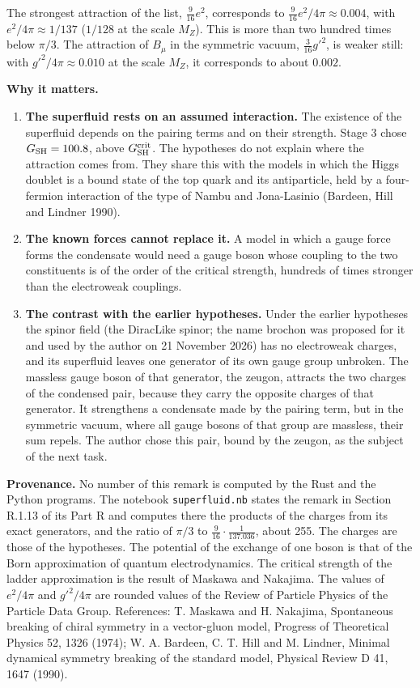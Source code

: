 \documentclass[
  10pt,
]{article}
\providecommand{\tightlist}{%
  \setlength{\itemsep}{0pt}\setlength{\parskip}{0pt}}
\begin{document}
The strongest attraction of the list, \(\tfrac9{16}e^2\), corresponds to
\(\tfrac9{16}e^2/4\pi\approx0.004\), with \(e^2/4\pi\approx1/137\)
(\(1/128\) at the scale \(M_Z\)). This is more than two hundred times
below \(\pi/3\). The attraction of \(B_\mu\) in the symmetric vacuum,
\(\tfrac3{16}g'^2\), is weaker still: with \(g'^2/4\pi\approx0.010\) at
the scale \(M_Z\), it corresponds to about \(0.002\).

\textbf{Why it matters.}

\begin{enumerate}
\def\labelenumi{\arabic{enumi}.}
\tightlist
\item
  \textbf{The superfluid rests on an assumed interaction.} The existence
  of the superfluid depends on the pairing terms and on their strength.
  Stage 3 chose \(G_{\rm SH}=100.8\), above \(G^{\rm crit}_{\rm SH}\).
  The hypotheses do not explain where the attraction comes from. They
  share this with the models in which the Higgs doublet is a bound state
  of the top quark and its antiparticle, held by a four-fermion
  interaction of the type of Nambu and Jona-Lasinio (Bardeen, Hill and
  Lindner 1990).
\item
  \textbf{The known forces cannot replace it.} A model in which a gauge
  force forms the condensate would need a gauge boson whose coupling to
  the two constituents is of the order of the critical strength,
  hundreds of times stronger than the electroweak couplings.
\item
  \textbf{The contrast with the earlier hypotheses.} Under the earlier
  hypotheses the spinor field (the DiracLike spinor; the name brochon
  was proposed for it and used by the author on 21 November 2026) has no
  electroweak charges, and its superfluid leaves one generator of its
  own gauge group unbroken. The massless gauge boson of that generator,
  the zeugon, attracts the two charges of the condensed pair, because
  they carry the opposite charges of that generator. It strengthens a
  condensate made by the pairing term, but in the symmetric vacuum,
  where all gauge bosons of that group are massless, their sum repels.
  The author chose this pair, bound by the zeugon, as the subject of the
  next task.
\end{enumerate}

\textbf{Provenance.} No number of this remark is computed by the Rust
and the Python programs. The notebook \texttt{superfluid.nb} states the
remark in Section R.1.13 of its Part R and computes there the products
of the charges from its exact generators, and the ratio of \(\pi/3\) to
\(\tfrac9{16}\cdot\tfrac1{137.036}\), about 255. The charges are those
of the hypotheses. The potential of the exchange of one boson is that of
the Born approximation of quantum electrodynamics. The critical strength
of the ladder approximation is the result of Maskawa and Nakajima. The
values of \(e^2/4\pi\) and \(g'^2/4\pi\) are rounded values of the
Review of Particle Physics of the Particle Data Group. References: T.
Maskawa and H. Nakajima, Spontaneous breaking of chiral symmetry in a
vector-gluon model, Progress of Theoretical Physics 52, 1326 (1974); W.
A. Bardeen, C. T. Hill and M. Lindner, Minimal dynamical symmetry
breaking of the standard model, Physical Review D 41, 1647 (1990).
\end{document}
